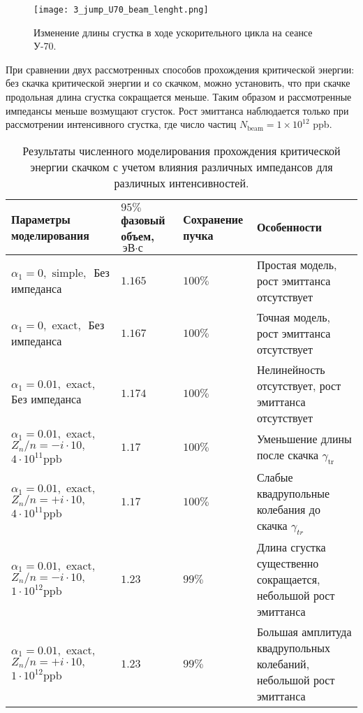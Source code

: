 \begin{figure}
   \centering
   \texttt{[image: 3\_jump\_U70\_beam\_lenght.png]}
   \caption{Изменение длины сгустка в ходе ускорительного цикла на сеансе У-70.}
   \label{fig:3_jump_U70_beam_lenght}
\end{figure}

\par При сравнении двух рассмотренных способов прохождения критической энергии: без скачка критической энергии и со скачком, можно установить, что при скачке продольная длина сгустка сокращается меньше. Таким образом и рассмотренные импедансы меньше возмущают сгусток. Рост эмиттанса наблюдается только при рассмотрении интенсивного сгустка, где число частиц $N_{\textrm{beam}}=1\times{10}^{12}$ ppb.

\begin{table}
\begin{center}
\begin{tabular}{| m{4cm} | M{2.5cm} | M{2.5cm} | m{6.6cm} |}
\hline 
Параметры моделирования & $95 \%$ фазовый объем, $\text{эВ}\cdot\text{с}$ & Сохранение пучка & Особенности \\
\hline
$ \alpha_1=0, \text { simple, } $ Без импеданса
 & $1.165$ & $100\%$ &
Простая модель, рост эмиттанса отсутствует \\
\hline
$ \alpha_1=0, \text { exact, } $ Без импеданса
 & $1.167$ & $100\%$ & 
Точная модель, рост эмиттанса отсутствует  \\
\hline
$ \alpha_1=0.01, \text { exact, }$ Без импеданса
 & $1.174$ & $100\%$ & Нелинейность отсутствует, рост эмиттанса отсутствует \\
\hline 
$ \alpha_1=0.01, \text { exact, } $
$ Z_n / n=-i \cdot 10, \quad $
$ 4 \cdot 10^{11} \mathrm{ppb} $
 & $1.17$ & $100\%$ & Уменьшение длины после скачка $\gamma_{\text {tr }}$ \\
\hline 
$ \alpha_1=0.01, \text { exact, } $
$ Z_n / n=+i \cdot 10, \quad $
$ 4 \cdot 10^{11} \mathrm{ppb} $
 & $1.17$ & $100\%$ & Слабые квадрупольные колебания до скачка $\gamma_{t r}$ \\
\hline
$ \alpha_1=0.01, \text { exact, } $
$ Z_n / n=-i \cdot 10, \quad$
$ 1 \cdot 10^{12} \mathrm{ppb} $
 & $1.23$ & $99\%$ & Длина сгустка существенно сокращается, небольшой рост эмиттанса \\
\hline
$ \alpha_1=0.01, \text { exact, } $
$ Z_n / n=+i \cdot 10, \quad$
$ 1 \cdot 10^{12} \mathrm{ppb} $
 & $1.23$ & $99\%$ & Большая амплитуда квадрупольных колебаний, небольшой рост эмиттанса \\
\hline
\end{tabular}
\end{center}
\caption{Результаты численного моделирования прохождения критической энергии скачком с учетом влияния различных импедансов для различных интенсивностей.}
\label{tab:u-70_model}
\end{table}

